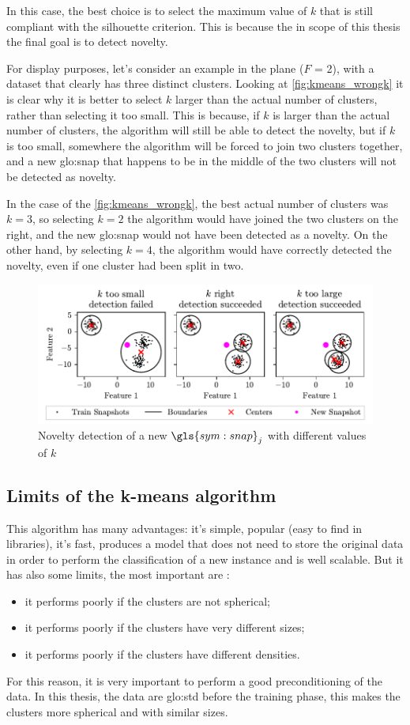 In this case, the best choice is to select the maximum value of $k$ that is still compliant with the silhouette criterion. This is because the in scope of this thesis the final goal is to detect novelty. 

For display purposes, let's consider an example in the plane ($F$ = 2), with a dataset that clearly has three distinct clusters. Looking at \autoref{fig:kmeans_wrongk} it is clear why it is better to select $k$ larger than the actual number of clusters, rather than selecting it too small. This is because, if $k$ is larger than the actual number of clusters, the algorithm will still be able to detect the novelty, but if $k$ is too small, somewhere the algorithm will be forced to join two clusters together, and a new {\gls{glo:snap}} that happens to be in the middle of the two clusters will not be detected as novelty. 

In the case of the \autoref{fig:kmeans_wrongk}, the best actual number of clusters was $k=3$, so selecting $k=2$ the algorithm would have joined the two clusters on the right, and the new {\gls{glo:snap}} would not have been detected as a novelty. On the other hand, by selecting $k=4$, the algorithm would have correctly detected the novelty, even if one cluster had been split in two.

\begin{figure}
  \centering
  \includegraphics[width=\textwidth]{images/Kmeans/Kmeans_wrongk.pdf}
  \caption{Novelty detection of a new $\gls{sym:snap}_j$ with different values of $k$}
  \label{fig:kmeans_wrongk}
\end{figure}


\subsection{Limits of the k-means algorithm}
\label{sec:kmeans_limits}
This algorithm has many advantages: it's simple, popular (easy to find in libraries), it's fast, produces a model that does not need to store the original data in order to perform the classification of a new instance and is well scalable. But it has also some limits, the most important are :
\begin{itemize}
  \item it performs poorly if the clusters are not spherical;
  \item it performs poorly if the clusters have very different sizes;
  \item it performs poorly if the clusters have different densities.
\end{itemize}

For this reason, it is very important to perform a good preconditioning of the data. In this thesis, the data are \gls{glo:std} before the training phase, this makes the clusters more spherical and with similar sizes. 



